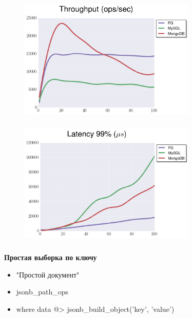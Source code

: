 \documentclass[usenames,dvipsnames, 18pt, compress, aspectratio=169]{beamer}
\begin{document}
\begin{frame}
    \frametitle{}
    \begin{center}
    \begin{figure}
        \includegraphics[width=0.75\textwidth,center]{benchmarks/select_jsonb_path_ops_throughput.png}
    \end{figure}
    \end{center}
\end{frame}

\begin{frame}
    \frametitle{}
    \begin{center}
    \begin{figure}
        \includegraphics[width=0.75\textwidth,center]{benchmarks/select_jsonb_path_ops_latency_99.png}
    \end{figure}
    \end{center}
\end{frame}

\begin{frame}
    \frametitle{}
    \begin{center}
        \textbf{Простая выборка по ключу}
        \begin{itemize}[label={}]
            \item "Простой документ"
            \item jsonb\_path\_ops
            \item where data @> jsonb\_build\_object('key', 'value')
        \end{itemize}
    \end{center}
\end{frame}
\end{document}
